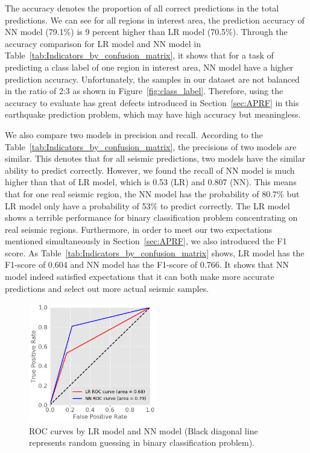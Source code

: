 \documentclass[final-report]{report-template}
\begin{document}
The accuracy denotes the proportion of all correct predictions in the total predictions. 
We can see for all regions in interest area, the prediction accuracy of NN model (79.1\%) is 9 percent higher than LR model (70.5\%).
Through the accuracy comparison for LR model and NN model in Table~\ref{tab:Indicators_by_confusion_matrix}, it shows that for a task of predicting a class label of one region in interest area, NN model have a higher prediction accuracy. 
Unfortunately, the samples in our dataset are not balanced in the ratio of 2:3 as shown in Figure~\ref{fig:class_label}.
Therefore, using the accuracy to evaluate has great defects introduced in Section~\ref{sec:APRF} in this earthquake prediction problem, which may have high accuracy but meaningless.  

We also compare two models in precision and recall. 
According to the Table~\ref{tab:Indicators_by_confusion_matrix}, the precisions of two models are similar.
This denotes that for all seismic predictions, two models have the similar ability to predict correctly.
However, we found the recall of NN model is much higher than that of LR model, which is 0.53 (LR) and 0.807 (NN).
This means that for one real seismic region, the NN model has the probability of 80.7\% but LR model only have a probability of 53\% to predict correctly. The LR model shows a terrible performance for binary classification problem concentrating on real seismic regions.
Furthermore, in order to meet our two expectations mentioned simultaneously in Section~\ref{sec:APRF}, we also introduced the F1 score. As Table~\ref{tab:Indicators_by_confusion_matrix} shows, LR model has the F1-score of 0.604 and NN model has the F1-score of 0.766.
It shows that NN model indeed satisfied expectations that it can both make more accurate predictions and select out more actual seismic samples.

\begin{figure}
    \begin{center}
        \includegraphics[width=0.5\textwidth]{ROC_curve.png}
    \end{center}
    \caption{\label{fig:ROC_curve} ROC curves by LR model and NN model (Black diagonal line represents random guessing in binary classification problem).}
\end{figure}
\end{document}
